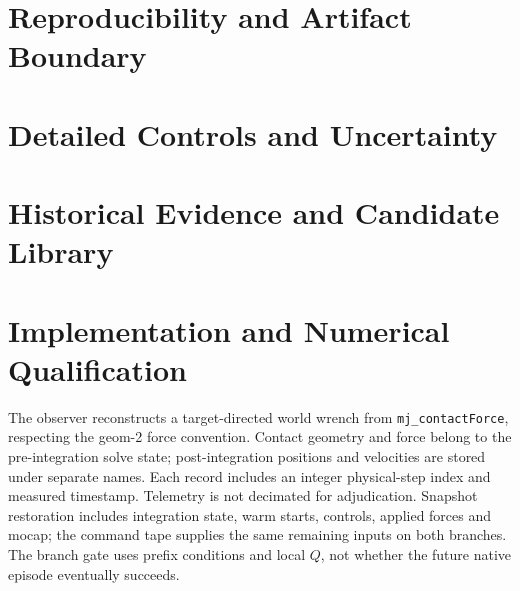\section{Reproducibility and Artifact Boundary}
\label{sec:artifact}


\section{Detailed Controls and Uncertainty}



\section{Historical Evidence and Candidate Library}




\section{Implementation and Numerical Qualification}
The observer reconstructs a target-directed world wrench from
\texttt{mj\_contactForce}, respecting the geom-2 force convention. Contact
geometry and force belong to the pre-integration solve state; post-integration
positions and velocities are stored under separate names. Each record includes
an integer physical-step index and measured timestamp. Telemetry is not
decimated for adjudication. Snapshot restoration includes integration state,
warm starts, controls, applied forces and mocap; the command tape supplies the
same remaining inputs on both branches. The branch gate uses prefix conditions
and local $Q$, not whether the future native episode eventually succeeds.

